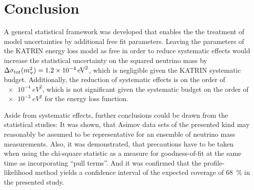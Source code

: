\section{Conclusion}
\label{sec:katrinElossModelOutlook}
A general statistical framework was developed that enables the the treatment of model uncertainties by additional free fit parameters. Leaving the parameters of the KATRIN energy loss model as free in order to reduce systematic effects would increase the statistical uncertainty on the squared neutrino mass by $\Delta \sigma_\mathrm{tot}(m_\upnu^2) = \SI{1.2e-4}{eV^2}$, which is negligible given the KATRIN systematic budget. Additionally, the reduction of systematic effects is on the order of $\SI{e-4}{eV^2}$, which is not significant given the systematic budget on the order of $\SI{e-3}{eV^2}$ for the energy loss function.

Aside from systematic effects, further conclusions could be drawn from the statistical studies: It was shown, that Asimov data sets of the presented kind may reasonably be assumed to be representative for an ensemble of neutrino mass measurements. Also, it was demonstrated, that precautions have to be taken when using the chi-square statistic as a measure for goodness-of-fit at the same time as incorporating ``pull terms''. And it was confirmed that the profile-likelihood method yields a confidence interval of the expected coverage of \SI{68}{\percent} in the presented study.